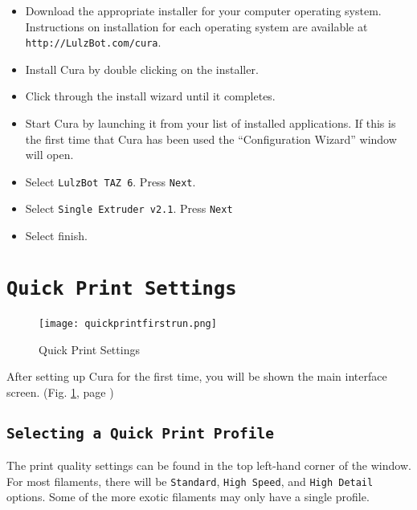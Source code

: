\begin{itemize}
\item Download the appropriate installer for your computer operating system. Instructions on installation for each operating system are available at \texttt{http://LulzBot.com/cura}.
\item Install Cura by double clicking on the installer.
\item Click through the install wizard until it completes.
\item Start Cura by launching it from your list of installed applications. If this is the first time that Cura has been used the ``Configuration Wizard'' window will open.
\item Select \texttt{LulzBot TAZ 6}. Press \texttt{Next}.
\item Select \texttt{Single Extruder v2.1}. Press \texttt{Next}
\item Select finish.
\end{itemize}




\section{\texttt{Quick Print Settings}}
\begin{figure}[H]
\centering
\texttt{[image: quickprintfirstrun.png]}
\caption{Quick Print Settings}
\label{fig:Cura}
\end{figure} 
After setting up Cura for the first time, you will be shown the main interface screen. (Fig. \ref{fig:Cura}, page \pageref{fig:Cura}) 

\subsection{\texttt{Selecting a Quick Print Profile}}
The print quality settings can be found in the top left-hand corner of the window. For most filaments, there will be \texttt{Standard}, \texttt{High Speed}, and \texttt{High Detail} options. Some of the more exotic filaments may only have a single profile.

